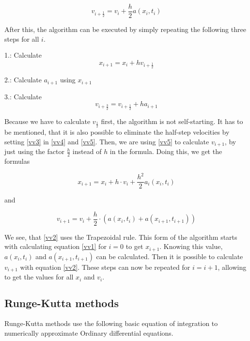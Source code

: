\documentclass[10pt,a4paper]{article}
\begin{document}
\begin{equation}
	\label{vv3}
	v_{i + \frac{1}{2}} = v_i + \frac{h}{2} a(x_i, t_i)
\end{equation}

After this, the algorithm can be executed by simply repeating the following three steps for all $i$.

1.: Calculate
\begin{equation}
	\label{vv4}
	x_{i+1} = x_i +h v_{i+ \frac{1}{2}}
\end{equation}

2.: Calculate $a_{i+1}$ using $x_{i+1}$

3.: Calculate
\begin{equation}
	\label{vv5}
v_{i+\frac{3}{2}} = v_{i+\frac{1}{2}} +h a_{i+1}
\end{equation}

Because we have to calculate $v_\frac{1}{2}$ first, the algorithm is not self-starting. It has to be mentioned, that it is also possible to eliminate the half-step velocities by setting \eqref{vv3} in \eqref{vv4} and \eqref{vv5}. Then, we are using \eqref{vv5} to calculate $v_{i+1}$, by just using the factor $\frac{h}{2}$ instead of $h$ in the formula.
Doing this, we get the formulas

\begin{equation}
\label{vv1}
x_{i+1} = x_i + h \cdot v_i + \frac{h^2}{2}  a_i(x_i, t_i)
\end{equation}

and

\begin{equation}
\label{vv2}
v_{i+1} = v_i + \frac{h}{2} \cdot (a(x_i, t_i) + a(x_{i+1}, t_{i+1}))
\end{equation}

We see, that \eqref{vv2} uses the Trapezoidal rule.
This form of the algorithm starts with calculating equation \eqref{vv1} for $i = 0$ to get $x_{i+1}$. Knowing this value, $a(x_i, t_i)$ and $a(x_{i+1}, t_{i+1})$ can be calculated. Then it is possible to calculate $v_{i+1}$ with equation \eqref{vv2}. These steps can now be repeated for $i = i+1$, allowing to get the values for all $x_i$ and $v_i$.

\subsection{Runge-Kutta methods}

Runge-Kutta methods use the following basic equation of integration to numerically approximate Ordinary differential equations.
\end{document}
